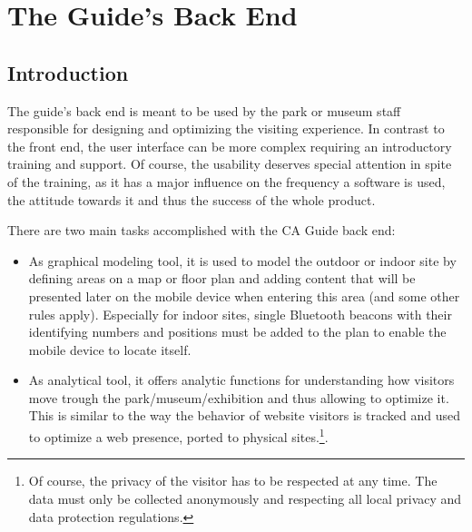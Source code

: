 
\chapter{The Guide's Back End} %

\label{backend} %



\section{Introduction}

The guide's back end is meant to be used by the park or museum staff responsible for designing and optimizing the visiting experience. In contrast to the front end, the user interface can be more complex requiring an introductory training and support. Of course, the usability deserves special attention in spite of the training, as it has a major influence on the frequency a software is used, the attitude towards it and thus the success of the whole product. %

There are two main tasks accomplished with the CA Guide back end:

\begin{itemize}
\item As graphical modeling tool, it is used to model the outdoor or indoor site by defining areas on a map or floor plan and adding content that will be presented later on the mobile device when entering this area (and some other rules apply). Especially for indoor sites, single Bluetooth beacons with their identifying numbers and positions must be added to the plan to enable the mobile device to locate itself.
\item As analytical tool, it offers analytic functions for understanding how visitors move trough the park/museum/exhibition and thus allowing to optimize it. This is similar to the way the behavior of website visitors is tracked and used to optimize a web presence, ported to physical sites.\footnote{Of course, the privacy of the visitor has to be respected at any time. The data must only be collected anonymously and respecting all local privacy and data protection regulations.}.
\end{itemize}

